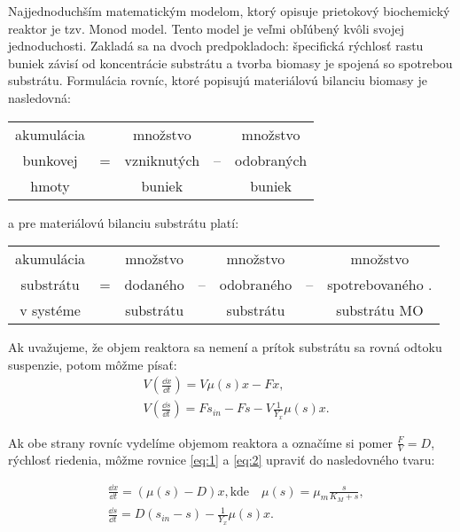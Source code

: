 Najjednoduchším matematickým modelom, ktorý opisuje prietokový biochemický reaktor je tzv. Monod model. Tento model je veľmi obľúbený kvôli svojej jednoduchosti. Zakladá sa na dvoch predpokladoch:  špecifická rýchlosť rastu buniek závisí od koncentrácie substrátu a  tvorba biomasy je spojená so spotrebou substrátu. Formulácia rovníc, ktoré popisujú materiálovú bilanciu biomasy je nasledovná:

\begin{table}[H]
	\centering
	\begin{tabular}{ccccc}
		akumulácia & & množstvo & & množstvo \\
		bunkovej & = & vzniknutých & -- & odobraných \\
		hmoty & & buniek & & buniek \\
	\end{tabular}
\end{table}
\noindent a pre materiálovú bilanciu substrátu platí:
\begin{table}[H]
	\centering
	\begin{tabular}{ccccccc}
		akumulácia & & množstvo & & množstvo & & množstvo\\
		substrátu & = & dodaného & -- & odobraného & -- & spotrebovaného .\\
		v systéme & & substrátu & & substrátu & & substrátu MO\\
	\end{tabular}
\end{table}
\noindent Ak uvažujeme, že objem reaktora sa nemení a prítok substrátu sa rovná odtoku suspenzie, potom môžme písať: 
\begin{align}
	&V\left(\frac{\dd x}{\dd t}\right) = V\mu(s)x - Fx, \label{eq:1} \\
	&V\left(\frac{\dd s}{\dd t}\right) = Fs_{in} - Fs - V\frac{1}{Y_{x}}\mu(s)x. \label{eq:2}
\end{align}

\noindent Ak obe strany rovníc vydelíme objemom reaktora a označíme si pomer $\frac{F}{V} = D$, rýchlosť riedenia, môžme rovnice \eqref{eq:1} a \eqref{eq:2} upraviť do nasledovného tvaru:

\begin{align} 
	&\frac{\dd x}{\dd t} = \left(\mu(s) - D\right)x, \text{kde}  \quad \mu(s) = \mu_{m}\frac{s}{K_{M} + s}, \label{eq:3} \\
	&\frac{\dd s}{\dd t} = D\left(s_{in} - s\right) - \frac{1}{Y_{x}}\mu(s)x. \label{eq:4}
\end{align}

